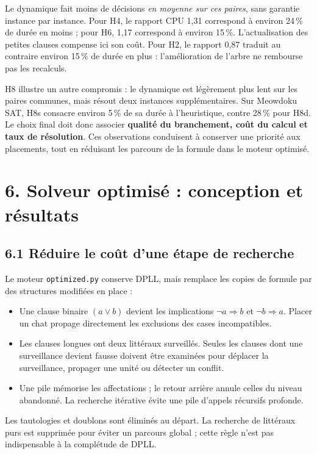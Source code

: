 \documentclass[11pt,a4paper]{article}
\begin{document}
Le dynamique fait moins de décisions \emph{en moyenne sur ces paires},
sans garantie instance par instance. Pour H4, le rapport CPU 1,31
correspond à environ 24\,\% de durée en moins ; pour H6, 1,17 correspond
à environ 15\,\%. L'actualisation des petites clauses compense ici son coût.
Pour H2, le rapport 0,87 traduit au contraire environ 15\,\% de durée en
plus : l'amélioration de l'arbre ne rembourse pas les recalculs.

H8 illustre un autre compromis : le dynamique est légèrement plus lent
sur les paires communes, mais résout deux instances supplémentaires.
Sur Meowdoku SAT, H8s consacre environ 5\,\% de sa durée à l'heuristique,
contre 28\,\% pour H8d. Le choix final doit donc associer
\textbf{qualité du branchement, coût du calcul et taux de résolution}.
Ces observations conduisent à conserver une priorité aux placements,
tout en réduisant les parcours de la formule dans le moteur optimisé.

\newpage
\section*{6. Solveur optimisé : conception et résultats}

\subsection*{6.1 Réduire le coût d'une étape de recherche}

Le moteur \texttt{optimized.py} conserve DPLL, mais remplace les copies
de formule par des structures modifiées en place :
\begin{itemize}
  \setlength{\itemsep}{2pt}
  \item Une clause binaire $(a\lor b)$ devient les implications
    $\neg a\Rightarrow b$ et $\neg b\Rightarrow a$. Placer un chat
    propage directement les exclusions des cases incompatibles.
  \item Les clauses longues ont deux littéraux surveillés. Seules les
    clauses dont une surveillance devient fausse doivent être examinées
    pour déplacer la surveillance, propager une unité ou détecter un conflit.
  \item Une pile mémorise les affectations ; le retour arrière annule celles
    du niveau abandonné. La recherche itérative évite une pile d'appels
    récursifs profonde.
\end{itemize}
Les tautologies et doublons sont éliminés au départ. La recherche de
littéraux purs est supprimée pour éviter un parcours global ; cette
règle n'est pas indispensable à la complétude de DPLL.
\end{document}
